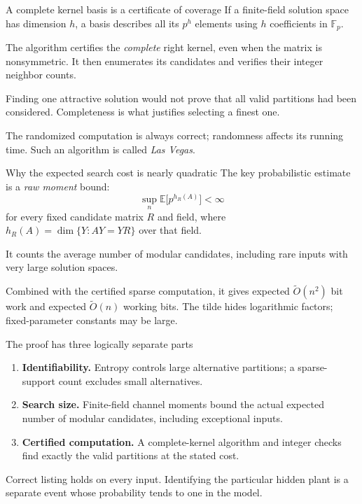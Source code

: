 \documentclass[aspectratio=169,11pt]{beamer}
\newcommand{\E}{\mathbb E}
\newcommand{\F}{\mathbb F}
\begin{document}
\begin{frame}{A complete kernel basis is a certificate of coverage}
If a finite-field solution space has dimension $h$, a basis describes
all its $p^h$ elements using $h$ coefficients in $\F_p$.

The algorithm certifies the \emph{complete} right kernel, even when the
matrix is nonsymmetric. It then enumerates its candidates and verifies
their integer neighbor counts.

Finding one attractive solution would not prove that all valid partitions
had been considered. Completeness is what justifies selecting a finest one.

The randomized computation is always correct; randomness affects its
running time. Such an algorithm is called \emph{Las Vegas}.
\end{frame}

\begin{frame}{Why the expected search cost is nearly quadratic}
The key probabilistic estimate is a \emph{raw moment} bound:
\[
 \sup_n\E\big[p^{h_R(A)}\big]<\infty
\]
for every fixed candidate matrix $R$ and field, where
$h_R(A)=\dim\{Y:AY=YR\}$ over that field.

It counts the average number of modular candidates, including rare
inputs with very large solution spaces.

Combined with the certified sparse computation, it gives expected
$\widetilde O(n^2)$ bit work and expected $\widetilde O(n)$ working bits.
The tilde hides logarithmic factors; fixed-parameter constants may be large.
\end{frame}

\begin{frame}{The proof has three logically separate parts}
\begin{enumerate}
\item \textbf{Identifiability.} Entropy controls large alternative
partitions; a sparse-support count excludes small alternatives.
\item \textbf{Search size.} Finite-field channel moments bound the actual
expected number of modular candidates, including exceptional inputs.
\item \textbf{Certified computation.} A complete-kernel algorithm and
integer checks find exactly the valid partitions at the stated cost.
\end{enumerate}
Correct listing holds on every input. Identifying the particular hidden
plant is a separate event whose probability tends to one in the model.
\end{frame}
\end{document}
